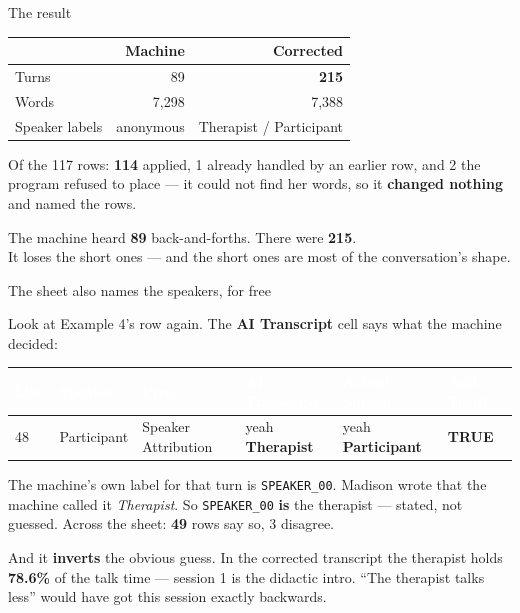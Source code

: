 \documentclass[aspectratio=169]{beamer}
\newcommand{\keybox}[1]{%
  \par\vspace{4pt}\begingroup\centering
  \colorbox{warmbg}{\parbox{0.93\textwidth}{\centering #1}}%
  \par\endgroup\vspace{2pt}}
\newcommand{\bigidea}[1]{%
  \vfill
  \begingroup\centering
  \colorbox{warmbg}{\parbox{0.93\textwidth}{\centering \large #1}}%
  \par\endgroup
  \vfill}
\newenvironment{nicetable}[1]
  {\par\vspace{2pt}\begingroup\centering\small
   \renewcommand{\arraystretch}{1.18}%
   \setlength{\tabcolsep}{6pt}\rowcolors{2}{band}{white}%
   \begin{tabular}{#1}\arrayrulecolor{hdr}\toprule}
  {\bottomrule\end{tabular}\par\endgroup\vspace{2pt}}
\newcommand{\sheetrow}[6]{%
  \par\vspace{3pt}\begingroup\centering\footnotesize
  \renewcommand{\arraystretch}{1.3}\setlength{\tabcolsep}{5pt}%
  \begin{tabular}{|>{\raggedright\arraybackslash}p{0.6cm}|>{\raggedright\arraybackslash}p{1.6cm}|>{\raggedright\arraybackslash}p{2.4cm}|>{\raggedright\arraybackslash}p{2.9cm}|>{\raggedright\arraybackslash}p{2.9cm}|>{\raggedright\arraybackslash}p{1.0cm}|}
  \hline
  \rowcolor{hdr}
  \textcolor{white}{\textbf{Line}} & \textcolor{white}{\textbf{Speaker}} &
  \textcolor{white}{\textbf{Error}} & \textcolor{white}{\textbf{AI Transcript}} &
  \textcolor{white}{\textbf{Actual Speech}} & \textcolor{white}{\textbf{Add Turn?}} \\
  \hline
  \rowcolor{warmbg}
  #1 & #2 & #3 & #4 & #5 & #6 \\
  \hline
  \end{tabular}\par\endgroup\vspace{4pt}}
\newcommand{\hd}[1]{\textcolor{hdr}{\textbf{#1}}}
\newcommand{\num}[1]{\textcolor{warm}{\textbf{#1}}}
\begin{document}
\begin{frame}{The result}

\begin{nicetable}{p{5.0cm}rr}
\hd{} & \hd{Machine} & \hd{Corrected} \\ \midrule
Turns          & 89      & \num{215} \\
Words          & 7{,}298 & 7{,}388 \\
Speaker labels & anonymous & Therapist / Participant \\
\end{nicetable}

\vspace{0.2em}
Of the 117 rows: \num{114} applied, 1 already handled by an earlier row, and 2 the program
refused to place --- it could not find her words, so it \textbf{changed nothing} and named
the rows.

\bigidea{The machine heard \num{89} back-and-forths. There were \num{215}.\\[3pt]
It loses the short ones --- and the short ones are most of the conversation's shape.}

\end{frame}

\begin{frame}{The sheet also names the speakers, for free}

Look at Example 4's row again. The \textbf{AI Transcript} cell says what the machine
decided:

\sheetrow{48}{Participant}{Speaker Attribution}{yeah \textbf{Therapist}}{yeah \textbf{Participant}}{\textbf{TRUE}}

\vspace{0.3em}
The machine's own label for that turn is \texttt{SPEAKER\_00}. Madison wrote that the machine
called it \emph{Therapist}. So \texttt{SPEAKER\_00} \textbf{is} the therapist --- stated, not
guessed. Across the sheet: \num{49} rows say so, 3 disagree.

\keybox{And it \textbf{inverts} the obvious guess. In the corrected transcript the therapist
holds \num{78.6\%} of the talk time --- session 1 is the didactic intro. ``The therapist
talks less'' would have got this session exactly backwards.}

\end{frame}
\end{document}
